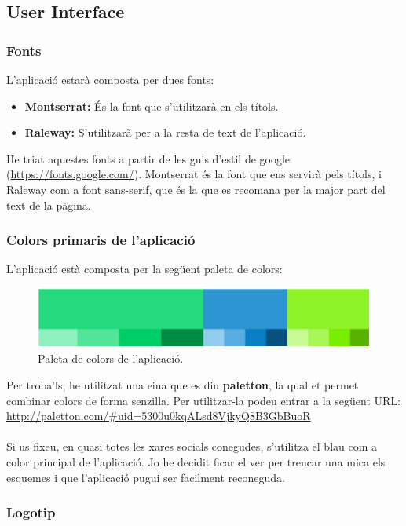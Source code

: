 \documentclass[11pt,catalan,listoffigures,listoftables]{tfgetsinf}
\begin{document}
\subsection{User Interface}

\subsubsection{Fonts}

L'aplicació estarà composta per dues fonts:
\begin{itemize}
\item \textbf{Montserrat:} És la font que s'utilitzarà en els títols.
\item \textbf{Raleway:} S'utilitzarà per a la resta de text de l'aplicació.
\end{itemize}
He triat aquestes fonts a partir de les guis d'estil de google (\url{https://fonts.google.com/}). Montserrat és la font que ens servirà pels títols, i Raleway com a font sans-serif, que és la que es recomana per la major part del text de la pàgina.

\subsubsection{Colors primaris de l'aplicació}

L'aplicació està composta per la següent paleta de colors:

\begin{figure}[h]
\includegraphics[width=12cm]{images/image1}
\centering
\caption[]{Paleta de colors de l'aplicació.}
\centering
\end{figure}
Per troba'ls, he utilitzat una eina que es diu \textbf{paletton}, la qual et permet combinar colors de forma senzilla. Per utilitzar-la podeu entrar a la següent URL:\\
\url{http://paletton.com/\#uid=5300u0kqALsd8VjkyQ8B3GbBuoR} \\ \\
Si us fixeu, en quasi totes les xares socials conegudes, s'utilitza el blau com a color principal de l'aplicació. Jo he decidit ficar el ver per trencar una mica els esquemes i que l'aplicació pugui ser facilment reconeguda.

\subsubsection{Logotip}
\end{document}
